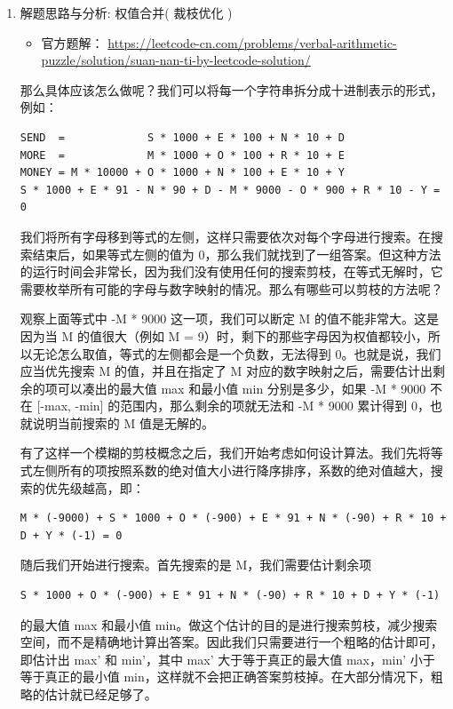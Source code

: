 \documentclass[9pt, b5paaper]{book}
\begin{document}
\begin{enumerate}
\item 解题思路与分析: 权值合并( 裁枝优化 )
\label{sec-8-0-3-2}
\begin{itemize}
\item 官方题解： \url{https://leetcode-cn.com/problems/verbal-arithmetic-puzzle/solution/suan-nan-ti-by-leetcode-solution/}
\end{itemize}
那么具体应该怎么做呢？我们可以将每一个字符串拆分成十进制表示的形式，例如：
\begin{verbatim}
SEND  =             S * 1000 + E * 100 + N * 10 + D
MORE  =             M * 1000 + O * 100 + R * 10 + E
MONEY = M * 10000 + O * 1000 + N * 100 + E * 10 + Y
S * 1000 + E * 91 - N * 90 + D - M * 9000 - O * 900 + R * 10 - Y = 0
\end{verbatim}
我们将所有字母移到等式的左侧，这样只需要依次对每个字母进行搜索。在搜索结束后，如果等式左侧的值为 0，那么我们就找到了一组答案。但这种方法的运行时间会非常长，因为我们没有使用任何的搜索剪枝，在等式无解时，它需要枚举所有可能的字母与数字映射的情况。那么有哪些可以剪枝的方法呢？

观察上面等式中 -M * 9000 这一项，我们可以断定 M 的值不能非常大。这是因为当 M 的值很大（例如 M = 9）时，剩下的那些字母因为权值都较小，所以无论怎么取值，等式的左侧都会是一个负数，无法得到 0。也就是说，我们应当优先搜索 M 的值，并且在指定了 M 对应的数字映射之后，需要估计出剩余的项可以凑出的最大值 max 和最小值 min 分别是多少，如果 -M * 9000 不在 [-max, -min] 的范围内，那么剩余的项就无法和 -M * 9000 累计得到 0，也就说明当前搜索的 M 值是无解的。

有了这样一个模糊的剪枝概念之后，我们开始考虑如何设计算法。我们先将等式左侧所有的项按照系数的绝对值大小进行降序排序，系数的绝对值越大，搜索的优先级越高，即：
\begin{verbatim}
M * (-9000) + S * 1000 + O * (-900) + E * 91 + N * (-90) + R * 10 + D + Y * (-1) = 0
\end{verbatim}

随后我们开始进行搜索。首先搜索的是 M，我们需要估计剩余项
\begin{verbatim}
S * 1000 + O * (-900) + E * 91 + N * (-90) + R * 10 + D + Y * (-1)
\end{verbatim}
的最大值 max 和最小值 min。做这个估计的目的是进行搜索剪枝，减少搜索空间，而不是精确地计算出答案。因此我们只需要进行一个粗略的估计即可，即估计出 max' 和 min'，其中 max' 大于等于真正的最大值 max，min' 小于等于真正的最小值 min，这样就不会把正确答案剪枝掉。在大部分情况下，粗略的估计就已经足够了。


\end{enumerate}
\end{document}
